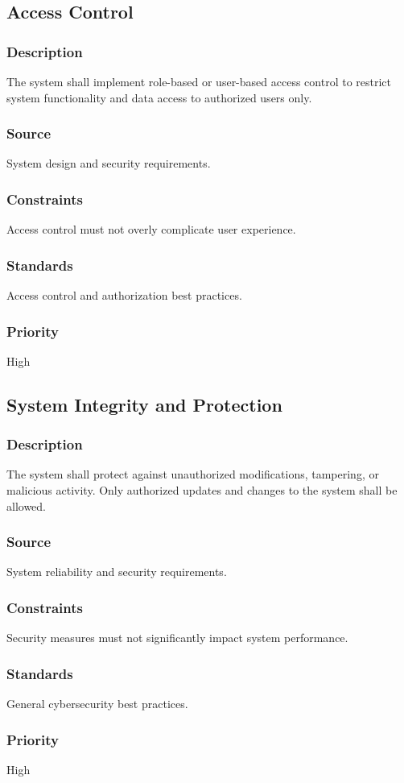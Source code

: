 \subsection{Access Control}
\subsubsection{Description}
The system shall implement role-based or user-based access control to restrict system functionality and data access to authorized users only.

\subsubsection{Source}
System design and security requirements.

\subsubsection{Constraints}
Access control must not overly complicate user experience.

\subsubsection{Standards}
Access control and authorization best practices.

\subsubsection{Priority}
High


\subsection{System Integrity and Protection}
\subsubsection{Description}
The system shall protect against unauthorized modifications, tampering, or malicious activity. Only authorized updates and changes to the system shall be allowed.

\subsubsection{Source}
System reliability and security requirements.

\subsubsection{Constraints}
Security measures must not significantly impact system performance.

\subsubsection{Standards}
General cybersecurity best practices.

\subsubsection{Priority}
High